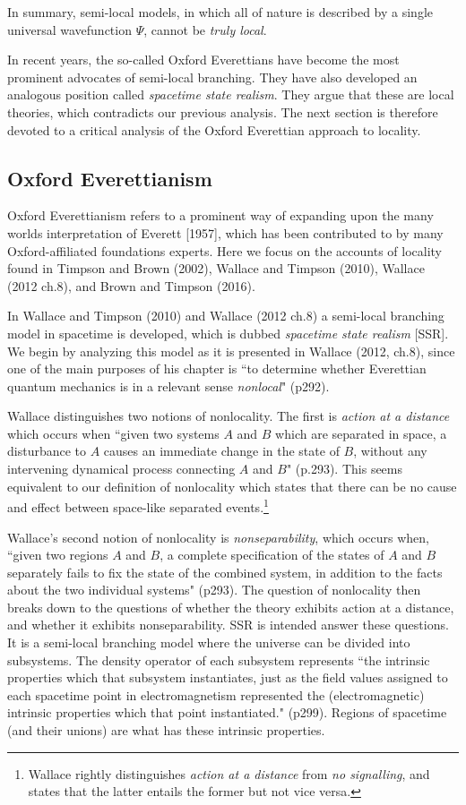 \documentclass[12pt]{article}
\begin{document}
In summary, semi-local models, in which all of nature is described by a single universal wavefunction $\Psi$, cannot be \textit{truly local}.

In recent years, the so-called Oxford Everettians have become the most prominent advocates of semi-local branching. They have also developed an analogous position called \textit{spacetime state realism}. They argue that these are local theories, which contradicts our previous analysis. The next section is therefore devoted to a critical analysis of the Oxford Everettian approach to locality. 


\subsection{Oxford Everettianism}\label{Oxford}


Oxford Everettianism refers to a prominent way of expanding upon the many worlds interpretation of Everett [1957], which has been contributed to by many Oxford-affiliated foundations experts. Here we focus on the accounts of locality found in Timpson and Brown (2002), Wallace and Timpson (2010), Wallace (2012 ch.8), and Brown and Timpson (2016).

In Wallace and Timpson (2010) and Wallace (2012 ch.8) a semi-local branching model in spacetime is developed, which is dubbed \textit{spacetime state realism} [SSR]. We begin by analyzing this model as it is presented in Wallace (2012, ch.8), since one of the main purposes of his chapter is ``to determine whether Everettian quantum mechanics is in a relevant sense \textit{nonlocal}" (p292). 

Wallace distinguishes two notions of nonlocality. The first is  \textit{action at a distance} which occurs when ``given two systems $A$ and $B$ which are separated in space, a disturbance to $A$ causes an immediate change in the state of $B$, without any intervening dynamical process connecting $A$ and $B$" (p.293). This seems equivalent to our definition of nonlocality which states that there can be no cause and effect between space-like separated events.\footnote{Wallace rightly distinguishes \textit{action at a distance} from \textit{no signalling}, and states that the latter entails the former but not vice versa.}


Wallace's second notion of nonlocality is \textit{nonseparability}, which occurs when, ``given two regions $A$ and $B$, a complete specification of the states of $A$ and $B$ separately fails to fix the state of the combined system, in addition to the facts about the two individual systems" (p293). The question of nonlocality then breaks down to the questions of whether the theory exhibits action at a distance, and whether it exhibits nonseparability. 
SSR is intended answer these questions. It is a semi-local branching model where the universe can be divided into subsystems. The density operator of each subsystem represents ``the intrinsic properties which that subsystem instantiates, just as the field values assigned to each spacetime point in electromagnetism represented the (electromagnetic) intrinsic properties which that point instantiated." (p299). Regions of spacetime (and their unions) are what has these intrinsic properties.
\end{document}
